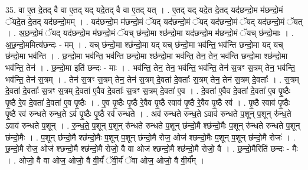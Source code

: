 \documentclass[17pt]{extarticle}
\begin{document}
35. वा ए॒त दे॒तद् वै वा ए॒तद् यद् यदे॒तद् वै वा ए॒तद् यत् । . ए॒तद् यद् यदे॒त दे॒तद् यद॑छन्दो॒म म॑छन्दो॒मं ॅयदे॒त दे॒तद् यद॑छन्दो॒मम् । . यद॑छन्दो॒म म॑छन्दो॒मं ॅयद् यद॑छन्दो॒मं ॅयद् यद॑छन्दो॒मं ॅयद् यद॑छन्दो॒मं ॅयत् । . अ॒छ॒न्दो॒मं ॅयद् यद॑छन्दो॒म म॑छन्दो॒मं ॅयच् छ॑न्दो॒मा श्छ॑न्दो॒मा यद॑छन्दो॒म म॑छन्दो॒मं ॅयच् छ॑न्दो॒माः । . अ॒छ॒न्दो॒ममित्य॑छन्दः - मम् । . यच् छ॑न्दो॒मा श्छ॑न्दो॒मा यद् यच् छ॑न्दो॒मा भव॑न्ति॒ भव॑न्ति छन्दो॒मा यद् यच् छ॑न्दो॒मा भव॑न्ति । . छ॒न्दो॒मा भव॑न्ति॒ भव॑न्ति छन्दो॒मा श्छ॑न्दो॒मा भव॑न्ति॒ तेन॒ तेन॒ भव॑न्ति छन्दो॒मा श्छ॑न्दो॒मा भव॑न्ति॒ तेन॑ । . छ॒न्दो॒मा इति॑ छन्दः - माः । . भव॑न्ति॒ तेन॒ तेन॒ भव॑न्ति॒ भव॑न्ति॒ तेन॑ स॒त्रꣳ स॒त्रम् तेन॒ भव॑न्ति॒ भव॑न्ति॒ तेन॑ स॒त्रम् । . तेन॑ स॒त्रꣳ स॒त्रम् तेन॒ तेन॑ स॒त्रम् दे॒वता॑ दे॒वताः᳚ स॒त्रम् तेन॒ तेन॑ स॒त्रम् दे॒वताः᳚ । . स॒त्रम् दे॒वता॑ दे॒वताः᳚ स॒त्रꣳ स॒त्रम् दे॒वता॑ ए॒वैव दे॒वताः᳚ स॒त्रꣳ स॒त्रम् दे॒वता॑ ए॒व । . दे॒वता॑ ए॒वैव दे॒वता॑ दे॒वता॑ ए॒व पृ॒ष्ठैः पृ॒ष्ठै रे॒व दे॒वता॑ दे॒वता॑ ए॒व पृ॒ष्ठैः । . ए॒व पृ॒ष्ठैः पृ॒ष्ठै रे॒वैव पृ॒ष्ठै रवाव॑ पृ॒ष्ठै रे॒वैव पृ॒ष्ठै रव॑ । . पृ॒ष्ठै रवाव॑ पृ॒ष्ठैः पृ॒ष्ठै रव॑ रुन्धते रुन्ध॒ते ऽव॑ पृ॒ष्ठैः पृ॒ष्ठै रव॑ रुन्धते । . अव॑ रुन्धते रुन्ध॒ते ऽवाव॑ रुन्धते प॒शून् प॒शून् रु॑न्ध॒ते ऽवाव॑ रुन्धते प॒शून् । . रु॒न्ध॒ते॒ प॒शून् प॒शून् रु॑न्धते रुन्धते प॒शून् छ॑न्दो॒मै श्छ॑न्दो॒मैः प॒शून् रु॑न्धते रुन्धते प॒शून् छ॑न्दो॒मैः । . प॒शून् छ॑न्दो॒मै श्छ॑न्दो॒मैः प॒शून् प॒शून् छ॑न्दो॒मै रोज॒ ओज॑ श्छन्दो॒मैः प॒शून् प॒शून् छ॑न्दो॒मै रोजः॑ । . छ॒न्दो॒मै रोज॒ ओज॑ श्छन्दो॒मै श्छ॑न्दो॒मै रोजो॒ वै वा ओज॑ श्छन्दो॒मै श्छ॑न्दो॒मै रोजो॒ वै । . छ॒न्दो॒मैरिति॑ छन्दः - मैः । . ओजो॒ वै वा ओज॒ ओजो॒ वै वी॒र्यं॑ ॅवी॒र्यं॑ ॅवा ओज॒ ओजो॒ वै वी॒र्य᳚म् । \newline
\end{document}
